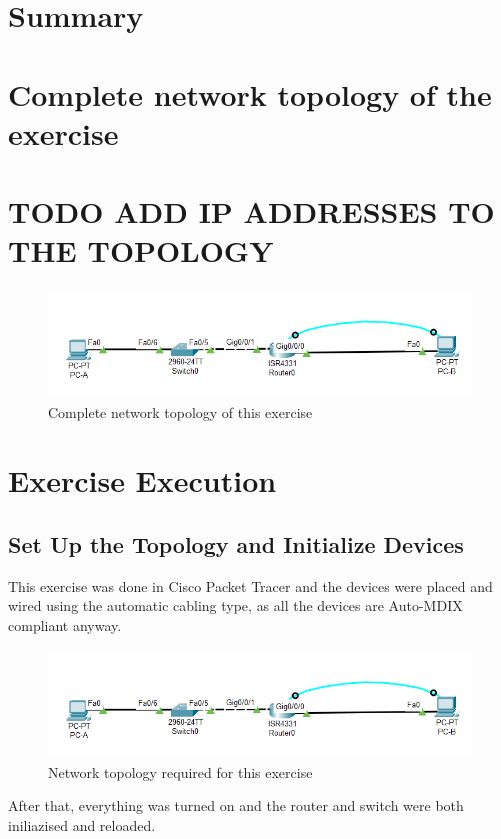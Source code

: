 \documentclass[a4paper]{article}
\newcommand{\abc}{\hfill \break}
\begin{document}
\section{Summary}

\newpage

\section{Complete network topology of the exercise}
\section{TODO ADD IP ADDRESSES TO THE TOPOLOGY}
\begin{figure}[h]
	\includegraphics[scale=0.65]{images/nwtopology.png}
	\centering
	\caption{Complete network topology of this exercise}
\end{figure}

\newpage

\section{Exercise Execution}
\subsection{Set Up the Topology and Initialize Devices}
This exercise was done in Cisco Packet Tracer and the devices were placed and wired using the automatic cabling type, as all the devices are Auto-MDIX compliant anyway.\abc
\begin{figure}[h]
	\includegraphics[scale=0.45]{images/nwtopology.png}
	\centering
	\caption{Network topology required for this exercise}
\end{figure}\abc
After that, everything was turned on and the router and switch were both iniliazised and reloaded.
\end{document}
